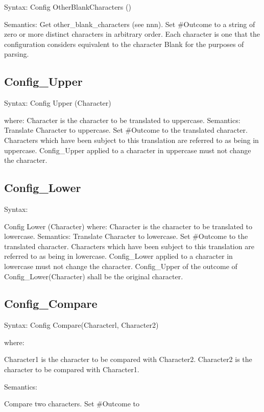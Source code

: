 Syntax: Config OtherBlankCharacters ()

Semantics: Get other\_blank\_characters (see nnn). Set \#Outcome to a
string of zero or more distinct characters in arbitrary order. Each
character is one that the configuration considers equivalent to the
character Blank for the purposes of parsing.

\subsection{Config\_Upper}\label{config_upper}

Syntax: Config Upper (Character)

where: Character is the character to be translated to uppercase.
Semantics: Translate Character to uppercase. Set \#Outcome to the
translated character. Characters which have been subject to this
translation are referred to as being in uppercase. Config\_Upper applied
to a character in uppercase must not change the character.

\subsection{Config\_Lower}\label{config_lower}

Syntax:

Config Lower (Character) where: Character is the character to be
translated to lowercase. Semantics: Translate Character to lowercase.
Set \#Outcome to the translated character. Characters which have been
subject to this translation are referred to as being in lowercase.
Config\_Lower applied to a character in lowercase must not change the
character. Config\_Upper of the outcome of Config\_Lower(Character)
shall be the original character.

\subsection{Config\_Compare}\label{config_compare}

Syntax: Config Compare(Characterl, Character2)

where:

Character1 is the character to be compared with Character2. Character2
is the character to be compared with Character1.

Semantics:

Compare two characters. Set \#Outcome to

